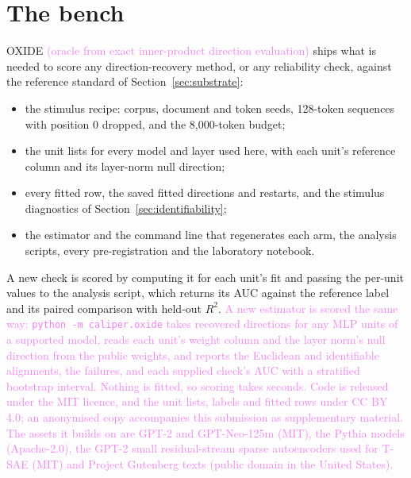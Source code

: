 \documentclass[10pt]{article}
\newcommand{\benchname}{OXIDE}
\newcommand{\draft}[1]{\textcolor{violet}{#1}}
\begin{document}
\FloatBarrier
\section{The bench}
\label{app:bench}
\benchname{}\draft{ (oracle from exact inner-product direction evaluation)} ships what is needed to score any direction-recovery method, or any reliability
check, against the reference standard of Section~\ref{sec:substrate}:
\begin{itemize}
  \item the stimulus recipe: corpus, document and token seeds, 128-token sequences with
  position 0 dropped, and the 8{,}000-token budget;
  \item the unit lists for every model and layer used here, with each unit's reference column
  and its layer-norm null direction;
  \item every fitted row, the saved fitted directions and restarts, and the stimulus
  diagnostics of Section~\ref{sec:identifiability};
  \item the estimator and the command line that regenerates each arm, the analysis scripts,
  every pre-registration and the laboratory notebook.
\end{itemize}
A new check is scored by computing it for each unit's fit and passing the per-unit values to
the analysis script, which returns its AUC against the reference label and its paired
comparison with held-out $R^2$. \draft{A new estimator is scored the same way: \texttt{python -m
caliper.oxide} takes recovered directions for any MLP units of a supported model, reads each unit's
weight column and the layer norm's null direction from the public weights, and reports the
Euclidean and identifiable alignments, the failures, and each supplied check's AUC with a
stratified bootstrap interval. Nothing is fitted, so scoring takes seconds.} \draft{Code is released under the MIT licence, and the unit lists, labels and fitted rows under CC BY 4.0; an anonymised copy accompanies this submission as supplementary material. The assets it builds on
are GPT-2 and GPT-Neo-125m (MIT), the Pythia models (Apache-2.0), the GPT-2 small residual-stream
sparse autoencoders used for T-SAE (MIT) and Project Gutenberg texts (public domain in the United
States).}

\FloatBarrier
\end{document}
